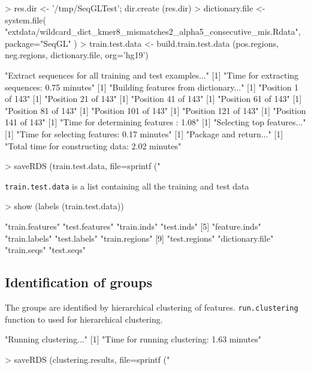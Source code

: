 \documentclass[10pt,oneside]{article}
\begin{document}
\begin{Schunk}
\begin{Sinput}
> res.dir <- '/tmp/SeqGLTest'; dir.create (res.dir)
> dictionary.file <- system.file( "extdata/wildcard_dict_kmer8_mismatches2_alpha5_consecutive_mis.Rdata", package="SeqGL" )
> train.test.data <- build.train.test.data (pos.regions, neg.regions, dictionary.file, org='hg19')
\end{Sinput}
\begin{Soutput}
[1] "Extract sequences for all training and test examples..."
[1] "Time for extracting sequences: 0.75 minutes"
[1] "Building features from dictionary..."
[1] "Position 1 of 143"
[1] "Position 21 of 143"
[1] "Position 41 of 143"
[1] "Position 61 of 143"
[1] "Position 81 of 143"
[1] "Position 101 of 143"
[1] "Position 121 of 143"
[1] "Position 141 of 143"
[1] "Time for determining features : 1.08"
[1] "Selecting top features..."
[1] "Time for selecting features: 0.17 minutes"
[1] "Package and return..."
[1] "Total time for constructing data: 2.02 minutes"
\end{Soutput}
\begin{Sinput}
> saveRDS (train.test.data, file=sprintf ("%s/train_test_data.Rds", res.dir))
\end{Sinput}
\end{Schunk}

\texttt{train.test.data} is a list containing all the training and test data
\begin{Schunk}
\begin{Sinput}
> show (labels (train.test.data))
\end{Sinput}
\begin{Soutput}
 [1] "train.features"  "test.features"   "train.inds"      "test.inds"      
 [5] "feature.inds"    "train.labels"    "test.labels"     "train.regions"  
 [9] "test.regions"    "dictionary.file" "train.seqs"      "test.seqs"      
\end{Soutput}
\end{Schunk}

\subsection{Identification of groups}

The groups are identified by hierarchical clustering of features. \texttt{run.clustering} function to used for hierarchical clustering.
\begin{Schunk}
\begin{Soutput}
[1] "Running clustering..."
[1] "Time for running clustering: 1.63 minutes"
\end{Soutput}
\begin{Sinput}
> saveRDS (clustering.results, file=sprintf ("%s/clustering_results.Rds", res.dir))
\end{Sinput}
\end{Schunk}
\end{document}
